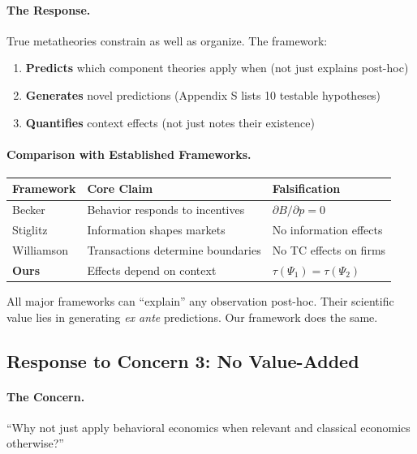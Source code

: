 \paragraph{The Response.}
True metatheories constrain as well as organize. The framework:
\begin{enumerate}
    \item \textbf{Predicts} which component theories apply when (not just explains post-hoc)
    \item \textbf{Generates} novel predictions (Appendix S lists 10 testable hypotheses)
    \item \textbf{Quantifies} context effects (not just notes their existence)
\end{enumerate}

\paragraph{Comparison with Established Frameworks.}

\begin{center}
\renewcommand{\arraystretch}{1.3}
\begin{tabular}{lll}
\hline
\textbf{Framework} & \textbf{Core Claim} & \textbf{Falsification} \\
\hline
Becker & Behavior responds to incentives & $\partial B/\partial p = 0$ \\
Stiglitz & Information shapes markets & No information effects \\
Williamson & Transactions determine boundaries & No TC effects on firms \\
\textbf{Ours} & Effects depend on context & $\tau(\Psi_1) = \tau(\Psi_2)$ \\
\hline
\end{tabular}
\end{center}

All major frameworks can ``explain'' any observation post-hoc. Their scientific value lies in generating \textit{ex ante} predictions. Our framework does the same.

\subsection{Response to Concern 3: No Value-Added}

\paragraph{The Concern.}
``Why not just apply behavioral economics when relevant and classical economics otherwise?''

